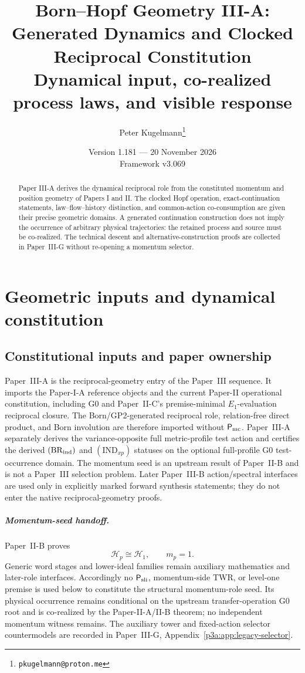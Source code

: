\documentclass[12pt,a4paper]{article}
\title{\textbf{Born--Hopf Geometry III-A: Generated Dynamics and Clocked Reciprocal Constitution}\\[0.5em]
\large Dynamical input, co-realized process laws, and visible response}
\author{Peter Kugelmann\thanks{\texttt{pkugelmann@proton.me}}}
\date{Version 1.181 --- 20 November 2026 \\ Framework v3.069}
\begin{document}
\maketitle
\begin{abstract}
Paper III-A derives the dynamical reciprocal role from the constituted
momentum and position geometry of Papers I and II. The clocked Hopf operation,
exact-continuation statements, law--flow--history distinction, and common-action
co-consumption are given their precise geometric domains. A generated
continuation construction does not imply the occurrence of arbitrary physical
trajectories: the retained process and source must be co-realized.
The technical descent and alternative-construction proofs are collected in
Paper~III-G without re-opening a momentum selector.
\end{abstract}
\tableofcontents
\clearpage

\section{Geometric inputs and dynamical constitution}
\label{paper3a:sec:organized-scope}
\subsection{Constitutional inputs and paper ownership}
\label{p3a:sec:series-allocation}
Paper~III-A is the reciprocal-geometry entry of the Paper~III sequence.  It
imports the Paper-I-A reference objects and the current Paper-II operational
constitution, including G0 and Paper~II-C's premise-minimal \(E_1\)-evaluation
reciprocal closure.  The Born/GP2-generated reciprocal role, relation-free direct
product, and Born involution are therefore imported without
\(\mathsf P_{\rm mc}\).  Paper~III-A separately derives the
variance-opposite full metric-profile test action and certifies the derived
\((\mathrm{BR}_{\rm ind})\) and \((\mathrm{IND}_{xp})\) statuses on the
optional full-profile G0 test-occurrence domain.  The
momentum seed is an upstream result of Paper~II-B and is not a Paper~III
selection problem.  Later Paper~III-B action/spectral interfaces are used only
in explicitly marked forward synthesis statements; they do not enter the
native reciprocal-geometry proofs.

\subparagraph{Momentum-seed handoff.}
Paper~II-B proves
\[
   \boxed{\mathcal H_p\cong\mathcal H_1,\qquad m_p=1.}
\]
Generic word stages and lower-ideal families remain auxiliary mathematics and
later-role interfaces.  Accordingly no \(\mathsf P_{\rm sli}\), momentum-side
TWR, or level-one premise is used below to constitute the structural
momentum-role seed.  Its physical occurrence remains conditional on
the upstream transfer-operation G0 root and is co-realized by the
Paper-II-A/II-B theorem; no independent momentum witness remains.  The auxiliary tower and fixed-action selector countermodels are recorded
in Paper~III-G, Appendix~\ref{p3a:app:legacy-selector}.
\end{document}
